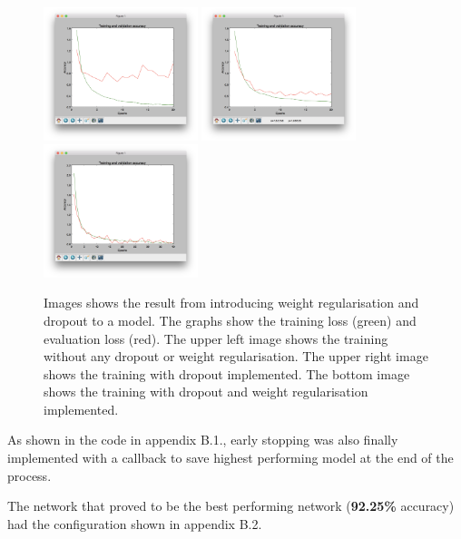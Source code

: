\begin{figure}[!hbtp]
\begin{center}
\includegraphics[width = 0.4\textwidth]{./Images/imageclassification1}
\includegraphics[width = 0.4\textwidth]{./Images/imageclassification2}
\includegraphics[width = 0.4\textwidth]{./Images/imageclassification3}
\caption{Images shows the result from introducing weight regularisation and dropout to a model. The graphs show the training loss (green) and evaluation loss (red). The upper left image shows the training without any dropout or weight regularisation. The upper right image shows the training with dropout implemented. The bottom image shows the training with dropout and weight regularisation implemented.}
\label{fig:imageclassification}
\end{center}
\end{figure}

As shown in the code in appendix B.1., early stopping was also finally implemented with a callback to save
highest performing model at the end of the process.

The network that proved to be the best performing network (\textbf{92.25\%} accuracy) had the configuration shown in appendix B.2.

